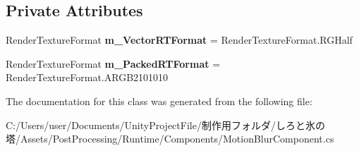 \subsection*{Private Attributes}
\begin{DoxyCompactItemize}
\item 
\mbox{\label{class_unity_engine_1_1_post_processing_1_1_motion_blur_component_1_1_reconstruction_filter_a9501a867b6f6be54b80e7952d3f47aab}} 
Render\+Texture\+Format {\bfseries m\+\_\+\+Vector\+R\+T\+Format} = Render\+Texture\+Format.\+R\+G\+Half
\item 
\mbox{\label{class_unity_engine_1_1_post_processing_1_1_motion_blur_component_1_1_reconstruction_filter_a7710b4697385239b8fbfc38b129088d4}} 
Render\+Texture\+Format {\bfseries m\+\_\+\+Packed\+R\+T\+Format} = Render\+Texture\+Format.\+A\+R\+G\+B2101010
\end{DoxyCompactItemize}


The documentation for this class was generated from the following file\+:\begin{DoxyCompactItemize}
\item 
C\+:/\+Users/user/\+Documents/\+Unity\+Project\+File/制作用フォルダ/しろと氷の塔/\+Assets/\+Post\+Processing/\+Runtime/\+Components/Motion\+Blur\+Component.\+cs\end{DoxyCompactItemize}
